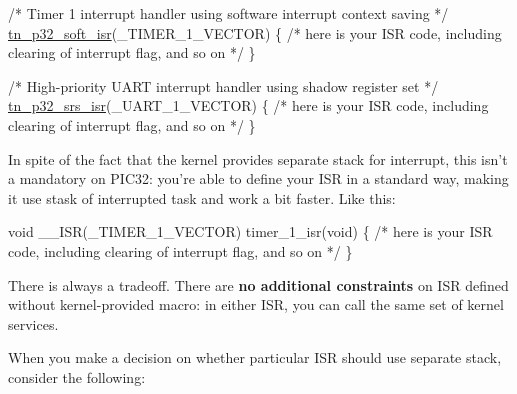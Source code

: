 \begin{DoxyCode}
\textcolor{comment}{/* Timer 1 interrupt handler using software interrupt context saving */}
\hyperlink{tn__arch__pic32_8h_a02d853d8d573f928fb8da65ef0c2bc8e}{tn\_p32\_soft\_isr}(\_TIMER\_1\_VECTOR)
\{
   \textcolor{comment}{/* here is your ISR code, including clearing of interrupt flag, and so on */}
\}

\textcolor{comment}{/* High-priority UART interrupt handler using shadow register set */}
\hyperlink{tn__arch__pic32_8h_a523bb667617e6bb6f68a8f85855030a5}{tn\_p32\_srs\_isr}(\_UART\_1\_VECTOR)
\{
   \textcolor{comment}{/* here is your ISR code, including clearing of interrupt flag, and so on */}
\}
\end{DoxyCode}


In spite of the fact that the kernel provides separate stack for interrupt, this isn't a mandatory on P\+I\+C32\+: you're able to define your I\+S\+R in a standard way, making it use stask of interrupted task and work a bit faster. Like this\+:


\begin{DoxyCode}
\textcolor{keywordtype}{void} \_\_ISR(\_TIMER\_1\_VECTOR) timer\_1\_isr(\textcolor{keywordtype}{void})
\{
   \textcolor{comment}{/* here is your ISR code, including clearing of interrupt flag, and so on */}
\}
\end{DoxyCode}


There is always a tradeoff. There are {\bfseries no additional constraints} on I\+S\+R defined without kernel-\/provided macro\+: in either I\+S\+R, you can call the same set of kernel services.

When you make a decision on whether particular I\+S\+R should use separate stack, consider the following\+:


